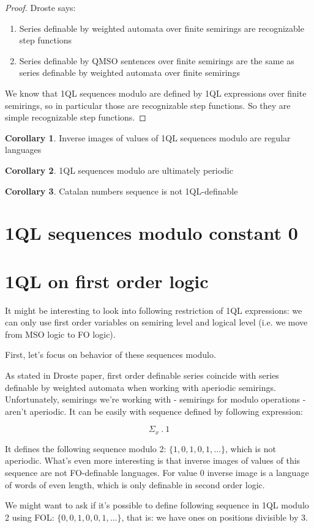 \documentclass[12pt]{article}
\theoremstyle{definition}
\newtheorem{corollary}{Corollary}[section]
\begin{document}
\begin{proof}
    Droste says:
    \begin{enumerate}
        \item Series definable by weighted automata over finite semirings are recognizable step functions
        \item Series definable by QMSO sentences over finite semirings are the same as series definable by weighted automata over finite semirings
    \end{enumerate}
    We know that 1QL sequences modulo are defined by 1QL expressions over finite semirings, so in particular those are recognizable step functions. So they are simple recognizable step functions.
\end{proof}

\begin{corollary}
    Inverse images of values of 1QL sequences modulo are regular languages
\end{corollary}

\begin{corollary}
    1QL sequences modulo are ultimately periodic
\end{corollary}

\begin{corollary}
    Catalan numbers sequence is not 1QL-definable
\end{corollary}

\section{1QL sequences modulo constant 0}

\section{1QL on first order logic}
It might be interesting to look into following restriction of 1QL expressions: we can only use first order variables on semiring level and logical level (i.e. we move from MSO logic to FO logic). 

First, let's focus on behavior of these sequences modulo.

As stated in Droste paper, first order definable series coincide with series definable by weighted automata when working with aperiodic semirings. Unfortunately, semirings we're working with - semirings for modulo operations - aren't aperiodic. It can be easily with sequence defined by following expression:

$$ \Sigma_x \ . \ 1 $$

It defines the following sequence modulo 2: $\{1, 0, 1, 0, 1, \ldots\}$, which is not aperiodic. What's even more interesting is that inverse images of values of this sequence are not FO-definable languages. For value $0$ inverse image is a language of words of even length, which is only definable in second order logic. 

We might want to ask if it's possible to define following sequence in 1QL modulo 2 using FOL: $\{0, 0, 1, 0, 0, 1, \ldots\}$, that is: we have ones on positions divisible by 3. 



\end{document}
